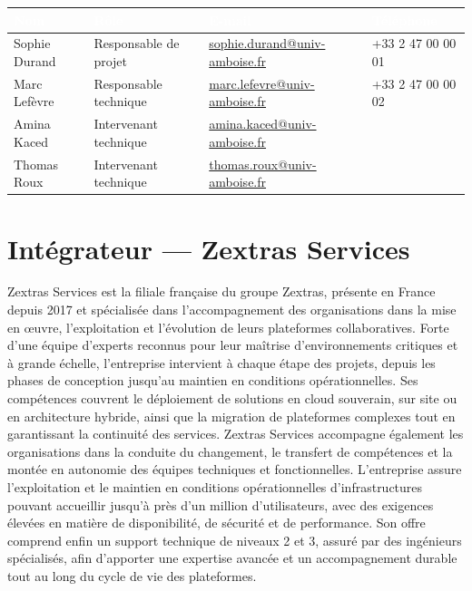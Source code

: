 \documentclass[11pt,a4paper]{report}
\newcommand{\tblhead}[1]{\textcolor{white}{\textbf{#1}}}
\begin{document}
\begin{longtable}{|p{3cm}|p{3cm}|p{4.3cm}|p{2.7cm}|}
\hline
\rowcolor{primary}\tblhead{Nom} & \tblhead{Rôle} & \tblhead{E-mail} & \tblhead{Téléphone} \\
\hline
\endhead
Sophie Durand & Responsable de projet & \href{mailto:sophie.durand@univ-amboise.fr}{sophie.\allowbreak{}durand@\allowbreak{}univ-\allowbreak{}amboise.\allowbreak{}fr} & +33 2 47 00 00 01 \\
\hline
Marc Lefèvre & Responsable technique & \href{mailto:marc.lefevre@univ-amboise.fr}{marc.\allowbreak{}lefevre@\allowbreak{}univ-\allowbreak{}amboise.\allowbreak{}fr} & +33 2 47 00 00 02 \\
\hline
Amina Kaced & Intervenant technique & \href{mailto:amina.kaced@univ-amboise.fr}{amina.\allowbreak{}kaced@\allowbreak{}univ-\allowbreak{}amboise.\allowbreak{}fr} &  \\
\hline
Thomas Roux & Intervenant technique & \href{mailto:thomas.roux@univ-amboise.fr}{thomas.\allowbreak{}roux@\allowbreak{}univ-\allowbreak{}amboise.\allowbreak{}fr} &  \\
\hline
\end{longtable}

\section{Intégrateur --- Zextras Services}
Zextras Services est la filiale française du groupe Zextras, présente en France depuis 2017 et spécialisée dans l'accompagnement des organisations dans la mise en œuvre, l'exploitation et l'évolution de leurs plateformes collaboratives.\allowbreak{} Forte d'une équipe d'experts reconnus pour leur maîtrise d'environnements critiques et à grande échelle, l'entreprise intervient à chaque étape des projets, depuis les phases de conception jusqu'au maintien en conditions opérationnelles.\allowbreak{} Ses compétences couvrent le déploiement de solutions en cloud souverain, sur site ou en architecture hybride, ainsi que la migration de plateformes complexes tout en garantissant la continuité des services.\allowbreak{} Zextras Services accompagne également les organisations dans la conduite du changement, le transfert de compétences et la montée en autonomie des équipes techniques et fonctionnelles.\allowbreak{} L'entreprise assure l'exploitation et le maintien en conditions opérationnelles d'infrastructures pouvant accueillir jusqu'à près d'un million d'utilisateurs, avec des exigences élevées en matière de disponibilité, de sécurité et de performance.\allowbreak{} Son offre comprend enfin un support technique de niveaux 2 et 3, assuré par des ingénieurs spécialisés, afin d'apporter une expertise avancée et un accompagnement durable tout au long du cycle de vie des plateformes.\allowbreak{}
\end{document}
